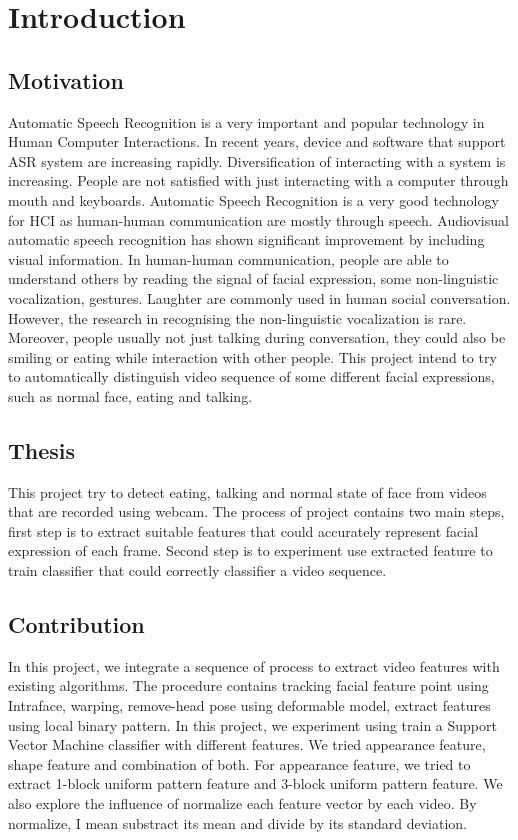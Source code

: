 \chapter{Introduction}
\section{Motivation}
Automatic Speech Recognition is a very important and popular technology in Human Computer Interactions. In recent years, device and software that support ASR system are increasing rapidly. Diversification of interacting with a system is increasing. People are not satisfied with just interacting with a computer through mouth and keyboards. Automatic Speech Recognition is a very good technology for HCI as human-human communication are mostly through speech. Audiovisual automatic speech recognition has shown significant improvement by including visual information. In human-human communication, people are able to understand others by reading the signal of facial expression, some non-linguistic vocalization, gestures. \cite{petridis2011prediction} Laughter are commonly used in human social conversation. However, the research in recognising the non-linguistic vocalization is rare. Moreover, people usually not just talking during conversation, they could also be smiling or eating while interaction with other people. This project intend to try to automatically distinguish video sequence of some different facial expressions, such as normal face, eating and talking.
\section{Thesis}
This project try to detect eating, talking and normal state of face from videos that are recorded using webcam. The process of project contains two main steps, first step is to extract suitable features that could accurately represent facial expression of each frame. Second step is to experiment use extracted feature to train classifier that could correctly classifier a video sequence.
\section{Contribution}
In this project, we integrate a sequence of process to extract video features with existing algorithms. The procedure contains tracking facial feature point using Intraface, warping, remove-head pose using deformable model, extract features using local binary pattern.
In this project, we experiment using train a Support Vector Machine classifier with different features. We tried appearance feature, shape feature and combination of both. For appearance feature, we tried to extract 1-block uniform pattern feature and 3-block uniform pattern feature. We also explore the influence of normalize each feature vector by each video. By normalize, I mean substract its mean and divide by its standard deviation.

